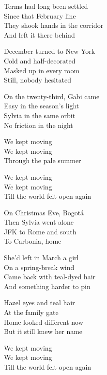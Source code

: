 \begin{lyrics}
Terms had long been settled\\
Since that February line\\
They shook hands in the corridor\\
And left it there behind

December turned to New York\\
Cold and half-decorated\\
Masked up in every room\\
Still, nobody hesitated

On the twenty-third, Gabi came\\
Easy in the season's light\\
Sylvia in the same orbit\\
No friction in the night

We kept moving\\
We kept moving\\
Through the pale summer

We kept moving\\
We kept moving\\
Till the world felt open again

On Christmas Eve, Bogotá\\
Then Sylvia went alone\\
JFK to Rome and south\\
To Carbonia, home

She'd left in March a girl\\
On a spring-break wind\\
Came back with teal-dyed hair\\
And something harder to pin

Hazel eyes and teal hair\\
At the family gate\\
Home looked different now\\
But it still knew her name

We kept moving\\
We kept moving\\
Till the world felt open again
\end{lyrics}

